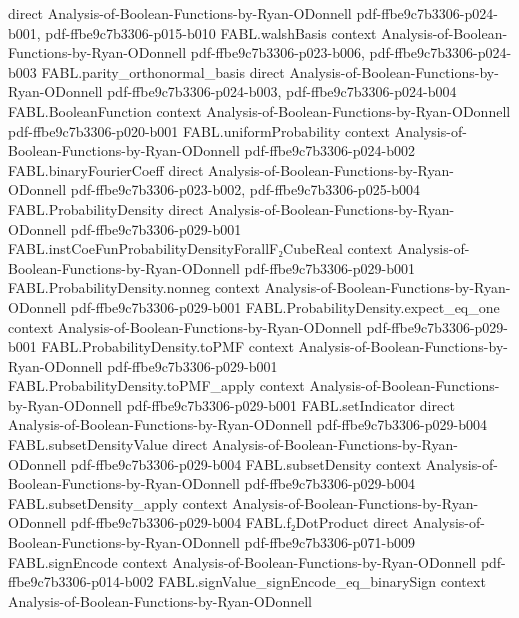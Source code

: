 \begin{theorem}
  {direct}
  {Analysis-of-Boolean-Functions-by-Ryan-ODonnell}
  {pdf-ffbe9c7b3306-p024-b001,
    pdf-ffbe9c7b3306-p015-b010}
\proofstep
  {FABL.walshBasis}
  {context}
  {Analysis-of-Boolean-Functions-by-Ryan-ODonnell}
  {pdf-ffbe9c7b3306-p023-b006,
    pdf-ffbe9c7b3306-p024-b003}
\proofstep
  {FABL.parity_orthonormal_basis}
  {direct}
  {Analysis-of-Boolean-Functions-by-Ryan-ODonnell}
  {pdf-ffbe9c7b3306-p024-b003,
    pdf-ffbe9c7b3306-p024-b004}
\proofstep
  {FABL.BooleanFunction}
  {context}
  {Analysis-of-Boolean-Functions-by-Ryan-ODonnell}
  {pdf-ffbe9c7b3306-p020-b001}
\proofstep
  {FABL.uniformProbability}
  {context}
  {Analysis-of-Boolean-Functions-by-Ryan-ODonnell}
  {pdf-ffbe9c7b3306-p024-b002}
\proofstep
  {FABL.binaryFourierCoeff}
  {direct}
  {Analysis-of-Boolean-Functions-by-Ryan-ODonnell}
  {pdf-ffbe9c7b3306-p023-b002,
    pdf-ffbe9c7b3306-p025-b004}
\proofstep
  {FABL.ProbabilityDensity}
  {direct}
  {Analysis-of-Boolean-Functions-by-Ryan-ODonnell}
  {pdf-ffbe9c7b3306-p029-b001}
\proofstep
  {FABL.instCoeFunProbabilityDensityForallF₂CubeReal}
  {context}
  {Analysis-of-Boolean-Functions-by-Ryan-ODonnell}
  {pdf-ffbe9c7b3306-p029-b001}
\proofstep
  {FABL.ProbabilityDensity.nonneg}
  {context}
  {Analysis-of-Boolean-Functions-by-Ryan-ODonnell}
  {pdf-ffbe9c7b3306-p029-b001}
\proofstep
  {FABL.ProbabilityDensity.expect_eq_one}
  {context}
  {Analysis-of-Boolean-Functions-by-Ryan-ODonnell}
  {pdf-ffbe9c7b3306-p029-b001}
\proofstep
  {FABL.ProbabilityDensity.toPMF}
  {context}
  {Analysis-of-Boolean-Functions-by-Ryan-ODonnell}
  {pdf-ffbe9c7b3306-p029-b001}
\proofstep
  {FABL.ProbabilityDensity.toPMF_apply}
  {context}
  {Analysis-of-Boolean-Functions-by-Ryan-ODonnell}
  {pdf-ffbe9c7b3306-p029-b001}
\proofstep
  {FABL.setIndicator}
  {direct}
  {Analysis-of-Boolean-Functions-by-Ryan-ODonnell}
  {pdf-ffbe9c7b3306-p029-b004}
\proofstep
  {FABL.subsetDensityValue}
  {direct}
  {Analysis-of-Boolean-Functions-by-Ryan-ODonnell}
  {pdf-ffbe9c7b3306-p029-b004}
\proofstep
  {FABL.subsetDensity}
  {context}
  {Analysis-of-Boolean-Functions-by-Ryan-ODonnell}
  {pdf-ffbe9c7b3306-p029-b004}
\proofstep
  {FABL.subsetDensity_apply}
  {context}
  {Analysis-of-Boolean-Functions-by-Ryan-ODonnell}
  {pdf-ffbe9c7b3306-p029-b004}
\proofstep
  {FABL.f₂DotProduct}
  {direct}
  {Analysis-of-Boolean-Functions-by-Ryan-ODonnell}
  {pdf-ffbe9c7b3306-p071-b009}
\proofstep
  {FABL.signEncode}
  {context}
  {Analysis-of-Boolean-Functions-by-Ryan-ODonnell}
  {pdf-ffbe9c7b3306-p014-b002}
\proofstep
  {FABL.signValue_signEncode_eq_binarySign}
  {context}
  {Analysis-of-Boolean-Functions-by-Ryan-ODonnell}

\end{theorem}
